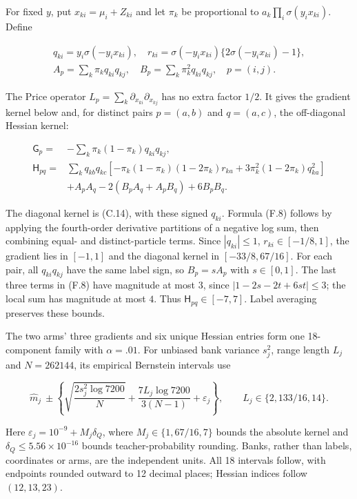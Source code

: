 \documentclass{article}
\begin{document}
For fixed \(y\), put \(x_{ki}=\mu_i+Z_{ki}\) and let \(\pi_k\) be
proportional to \(a_k\prod_i\sigma(y_ix_{ki})\). Define

\[
\begin{gathered}
q_{ki}=y_i\sigma(-y_ix_{ki}),\quad
r_{ki}=\sigma(-y_ix_{ki})\{2\sigma(-y_ix_{ki})-1\},\\
A_p=\sum_k\pi_kq_{ki}q_{kj},\quad B_p=\sum_k\pi_k^2q_{ki}q_{kj},\quad p=(i,j).
\end{gathered}
\tag{F.7}
\]

The Price operator \(L_p=\sum_k\partial_{x_{ki}}\partial_{x_{kj}}\) has
no extra factor \(1/2\). It gives the gradient kernel below and, for
distinct pairs \(p=(a,b)\) and \(q=(a,c)\), the off-diagonal Hessian
kernel:

\[
\begin{aligned}
\mathsf G_p={}&-\sum_k\pi_k(1-\pi_k)q_{ki}q_{kj},\\
\mathsf H_{pq}={}&\sum_kq_{kb}q_{kc}\left[-\pi_k(1-\pi_k)(1-2\pi_k)r_{ka}
+3\pi_k^2(1-2\pi_k)q_{ka}^2\right]\\
&+A_pA_q-2(B_pA_q+A_pB_q)+6B_pB_q.
\end{aligned}
\tag{F.8}
\]

The diagonal kernel is (C.14), with these signed \(q_{ki}\). Formula
(F.8) follows by applying the fourth-order derivative partitions of a
negative log sum, then combining equal- and distinct-particle terms.
Since \(|q_{ki}|\le1\), \(r_{ki}\in[-1/8,1]\), the gradient lies in
\([-1,1]\) and the diagonal kernel in \([-33/8,67/16]\). For each pair,
all \(q_{ki}q_{kj}\) have the same label sign, so \(B_p=sA_p\) with
\(s\in[0,1]\). The last three terms in (F.8) have magnitude at most
\(3\), since \(|1-2s-2t+6st|\le3\); the local sum has magnitude at most
\(4\). Thus \(\mathsf H_{pq}\in[-7,7]\). Label averaging preserves these
bounds.

The two arms' three gradients and six unique Hessian entries form one
18-component family with \(\alpha=.01\). For unbiased bank variance
\(s_j^2\), range length \(L_j\) and \(N=262144\), its empirical
Bernstein intervals use

\[
\widehat m_j\ \pm\left\{\sqrt{\frac{2s_j^2\log7200}{N}}
+\frac{7L_j\log7200}{3(N-1)}+\varepsilon_j\right\},\qquad
L_j\in\{2,133/16,14\}.
\tag{F.9}
\]

Here \(\varepsilon_j=10^{-9}+M_j\delta_Q\), where
\(M_j\in\{1,67/16,7\}\) bounds the absolute kernel and
\(\delta_Q\le5.56\times10^{-16}\) bounds teacher-probability rounding.
Banks, rather than labels, coordinates or arms, are the independent
units. All 18 intervals follow, with endpoints rounded outward to 12
decimal places; Hessian indices follow \((12,13,23)\).
\end{document}
